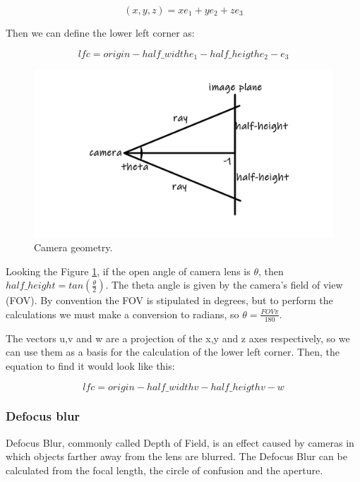 \documentclass[titlepage,12pt]{report}
\begin{document}
\begin{equation}
(x,y,z) = xe_1 + ye_2 + ze_3
\end{equation}

Then we can define the lower left corner as:

\begin{equation}
lfc = origin - half\_width e_1 - half\_heigth e_2 - e_3
\end{equation}

\begin{figure}[!ht]
	\centering
	\includegraphics[scale=0.65]{media/camera-model-summary-0.jpg}
	\caption{Camera geometry.}
	\label{camegeom2}
\end{figure}

Looking the Figure \ref{camegeom2}, if the open angle of camera lens is $\theta$, then $half\_height = tan(\frac{\theta}{2})$. The theta angle is given by the camera's field of view (FOV). By convention the FOV is stipulated in degrees, but to perform the calculations we must make a conversion to radians, so $\theta = \frac{FOV \pi}{180}$.

The vectors u,v and w are a projection of the x,y and z axes respectively, so we can use them as a basis for the calculation of the lower left corner. Then, the equation to find it would look like this:

\begin{equation}
lfc = origin - half\_width v - half\_heigth v - w
\end{equation}

\subsubsection{Defocus blur}

Defocus Blur, commonly called Depth of Field, is an effect caused by cameras in which objects farther away from the lens are blurred. The Defocus Blur can be calculated from the focal length, the circle of confusion and the aperture.
\end{document}
